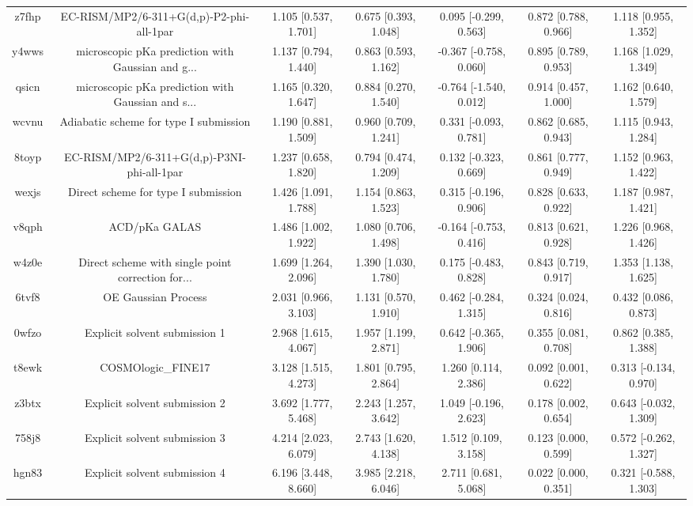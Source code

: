\documentclass{article}
\begin{document}
\begin{center}
\begin{longtable}{|ccccccc|}
 z7fhp &           EC-RISM/MP2/6-311+G(d,p)-P2-phi-all-1par &  1.105 [0.537, 1.701] &  0.675 [0.393, 1.048] &    0.095 [-0.299, 0.563] &  0.872 [0.788, 0.966] &   1.118 [0.955, 1.352] \\
 y4wws &  microscopic pKa prediction with Gaussian and g... &  1.137 [0.794, 1.440] &  0.863 [0.593, 1.162] &   -0.367 [-0.758, 0.060] &  0.895 [0.789, 0.953] &   1.168 [1.029, 1.349] \\
 qsicn &  microscopic pKa prediction with Gaussian and s... &  1.165 [0.320, 1.647] &  0.884 [0.270, 1.540] &   -0.764 [-1.540, 0.012] &  0.914 [0.457, 1.000] &   1.162 [0.640, 1.579] \\
 wcvnu &             Adiabatic scheme for type I submission &  1.190 [0.881, 1.509] &  0.960 [0.709, 1.241] &    0.331 [-0.093, 0.781] &  0.862 [0.685, 0.943] &   1.115 [0.943, 1.284] \\
 8toyp &         EC-RISM/MP2/6-311+G(d,p)-P3NI-phi-all-1par &  1.237 [0.658, 1.820] &  0.794 [0.474, 1.209] &    0.132 [-0.323, 0.669] &  0.861 [0.777, 0.949] &   1.152 [0.963, 1.422] \\
 wexjs &                Direct scheme for type I submission &  1.426 [1.091, 1.788] &  1.154 [0.863, 1.523] &    0.315 [-0.196, 0.906] &  0.828 [0.633, 0.922] &   1.187 [0.987, 1.421] \\
 v8qph &                                      ACD/pKa GALAS &  1.486 [1.002, 1.922] &  1.080 [0.706, 1.498] &   -0.164 [-0.753, 0.416] &  0.813 [0.621, 0.928] &   1.226 [0.968, 1.426] \\
 w4z0e &  Direct scheme with single point correction for... &  1.699 [1.264, 2.096] &  1.390 [1.030, 1.780] &    0.175 [-0.483, 0.828] &  0.843 [0.719, 0.917] &   1.353 [1.138, 1.625] \\
 6tvf8 &                                OE Gaussian Process &  2.031 [0.966, 3.103] &  1.131 [0.570, 1.910] &    0.462 [-0.284, 1.315] &  0.324 [0.024, 0.816] &   0.432 [0.086, 0.873] \\
 0wfzo &                      Explicit solvent submission 1 &  2.968 [1.615, 4.067] &  1.957 [1.199, 2.871] &    0.642 [-0.365, 1.906] &  0.355 [0.081, 0.708] &   0.862 [0.385, 1.388] \\
 t8ewk &                                 COSMOlogic\_FINE17 &  3.128 [1.515, 4.273] &  1.801 [0.795, 2.864] &     1.260 [0.114, 2.386] &  0.092 [0.001, 0.622] &  0.313 [-0.134, 0.970] \\
 z3btx &                      Explicit solvent submission 2 &  3.692 [1.777, 5.468] &  2.243 [1.257, 3.642] &    1.049 [-0.196, 2.623] &  0.178 [0.002, 0.654] &  0.643 [-0.032, 1.309] \\
 758j8 &                      Explicit solvent submission 3 &  4.214 [2.023, 6.079] &  2.743 [1.620, 4.138] &     1.512 [0.109, 3.158] &  0.123 [0.000, 0.599] &  0.572 [-0.262, 1.327] \\
 hgn83 &                      Explicit solvent submission 4 &  6.196 [3.448, 8.660] &  3.985 [2.218, 6.046] &     2.711 [0.681, 5.068] &  0.022 [0.000, 0.351] &  0.321 [-0.588, 1.303] \\
\end{longtable}
\end{center}
\end{document}
